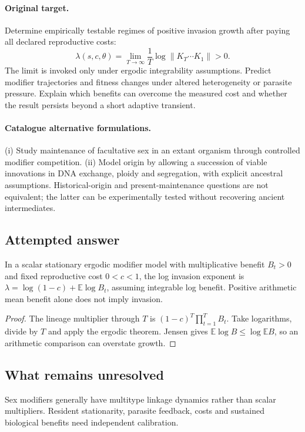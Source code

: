 \documentclass[11pt]{article}
\begin{document}
\paragraph{Original target.}
Determine empirically testable regimes of positive invasion growth after paying all declared reproductive costs:
\[
\lambda(s,c,\theta)=\lim_{T\to\infty}\frac1T\log\|K_T\cdots K_1\|>0.
\]
The limit is invoked only under ergodic integrability assumptions. Predict modifier trajectories and fitness changes under altered heterogeneity or parasite pressure. Explain which benefits can overcome the measured cost and whether the result persists beyond a short adaptive transient.
\paragraph{Catalogue alternative formulations.}
(i) Study maintenance of facultative sex in an extant organism through controlled modifier competition. (ii) Model origin by allowing a succession of viable innovations in DNA exchange, ploidy and segregation, with explicit ancestral assumptions. Historical-origin and present-maintenance questions are not equivalent; the latter can be experimentally tested without recovering ancient intermediates.
\subsection{Attempted answer}
\begin{proposition}
In a scalar stationary ergodic modifier model with multiplicative benefit $B_t>0$ and fixed reproductive cost $0<c<1$, the log invasion exponent is $\lambda=\log(1-c)+\mathbb{E}\log B_t$, assuming integrable log benefit. Positive arithmetic mean benefit alone does not imply invasion.
\end{proposition}
\begin{proof}
The lineage multiplier through $T$ is $(1-c)^T\prod_{t=1}^TB_t$. Take logarithms, divide by $T$ and apply the ergodic theorem. Jensen gives $\mathbb{E}\log B\leq\log\mathbb{E} B$, so an arithmetic comparison can overstate growth.
\end{proof}
\subsection{What remains unresolved}
Sex modifiers generally have multitype linkage dynamics rather than scalar multipliers. Resident stationarity, parasite feedback, costs and sustained biological benefits need independent calibration.
\end{document}
